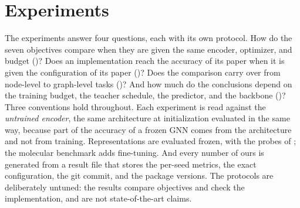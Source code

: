 \documentclass[conference]{IEEEtran}
\begin{document}
\section{Experiments}
\label{sec:results}
The experiments answer four questions, each with its own protocol. How do the seven objectives compare when they are given the same encoder, optimizer, and budget ()? Does an implementation reach the accuracy of its paper when it is given the configuration of its paper ()? Does the comparison carry over from node-level to graph-level tasks ()? And how much do the conclusions depend on the training budget, the teacher schedule, the predictor, and the backbone ()? Three conventions hold throughout. Each experiment is read against the \textit{untrained encoder}, the same architecture at initialization evaluated in the same way, because part of the accuracy of a frozen GNN comes from the architecture and not from training. Representations are evaluated frozen, with the probes of ; the molecular benchmark adds fine-tuning. And every number of ours is generated from a result file that stores the per-seed metrics, the exact configuration, the git commit, and the package versions. The protocols are deliberately untuned: the results compare objectives and check the implementation, and are not state-of-the-art claims.
\end{document}
